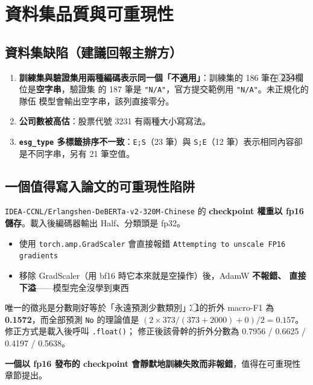 \documentclass[11pt,a4paper]{ctexart}
\newcommand{\fn}[1]{\texttt{#1}}
\begin{document}
\section{資料集品質與可重現性}

\subsection{資料集缺陷（建議回報主辦方）}

\begin{enumerate}[leftmargin=2em, itemsep=3pt]
  \item \textbf{訓練集與驗證集用兩種編碼表示同一個「不適用」}：訓練集的 186 筆在
        \textcircled{2}\textcircled{3}\textcircled{4}欄位是\textbf{空字串}，驗證集
        的 187 筆是 \texttt{"N/A"}，官方提交範例用 \texttt{"N/A"}。未正規化的隊伍
        模型會輸出空字串，該列直接零分。
  \item \textbf{公司數被高估}：股票代號 3231 有兩種大小寫寫法。
  \item \textbf{\fn{esg\_type} 多標籤排序不一致}：\texttt{E;S}（23 筆）與
        \texttt{S;E}（12 筆）表示相同內容卻是不同字串，另有 21 筆空值。
\end{enumerate}

\subsection{一個值得寫入論文的可重現性陷阱}

\fn{IDEA-CCNL/Erlangshen-DeBERTa-v2-320M-Chinese} 的 \textbf{checkpoint 權重以 fp16
儲存}。載入後編碼器輸出 Half、分類頭是 fp32。

\begin{itemize}[leftmargin=2em, itemsep=1pt]
  \item 使用 \texttt{torch.amp.GradScaler} 會直接報錯
        \texttt{Attempting to unscale FP16 gradients}
  \item 移除 GradScaler（用 bf16 時它本來就是空操作）後，AdamW \textbf{不報錯、
        直接下溢}——模型完全沒學到東西
\end{itemize}

唯一的徵兆是分數剛好等於「永遠預測少數類別」：\textcircled{1}的折外 macro-F1 為
\textbf{0.1572}，而全部預測 \fn{No} 的理論值是
$(2\times373/(373+2000) + 0)/2 = 0.157$。修正方式是載入後呼叫 \texttt{.float()}；
修正後該骨幹的折外分數為 0.7956 / 0.6625 / 0.4197 / 0.5638。

\textbf{一個以 fp16 發布的 checkpoint 會靜默地訓練失敗而非報錯}，值得在可重現性
章節提出。
\end{document}
